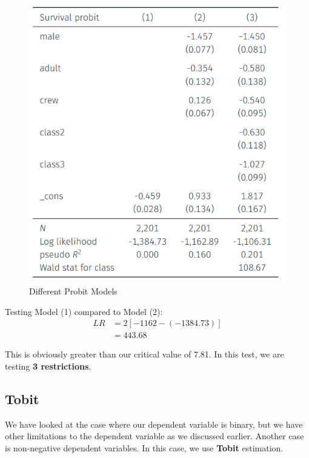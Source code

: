 \documentclass[11pt]{article}
\begin{document}
\begin{figure}[h]
    \centering
    \includegraphics[width=12cm]{photos/LR example probot.png}
    \caption{Different Probit Models}
    \label{fig: LR example}
\end{figure}

Testing Model (1) compared to Model (2):
\begin{align*}
    LR &= 2[-1162 - (-1384.73)]\\
    & = 443.68
\end{align*}

This is obviously greater than our critical value of 7.81. In this test, we are testing \textbf{3 restrictions}.

\subsection{Tobit}

We have looked at the case where our dependent variable is binary, but we have other limitations to the dependent variable as we discussed earlier. Another case is non-negative dependent variables. In this case, we use \textbf{Tobit} estimation.
\end{document}
